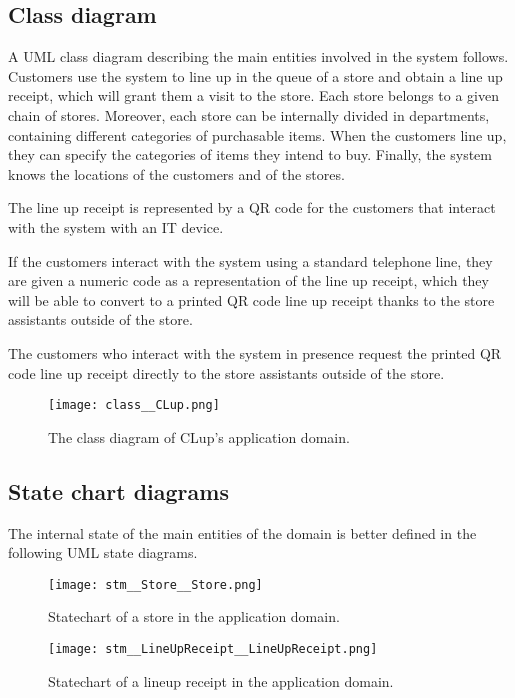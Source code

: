 \documentclass[../../main.tex]{subfiles}
\begin{document}
\subsection{Class diagram}

A UML class diagram describing the main entities involved in the system follows.
Customers use the system to line up in the queue of a store and obtain a line up
receipt, which will grant them a visit to the store. Each store belongs to a given
chain of stores. Moreover, each store can be internally divided in departments,
containing different categories of purchasable items. When the customers line
up, they can specify the categories of items they intend to buy. Finally, the
system knows the locations of the customers and of the stores.

The line up receipt is represented by a QR code for the customers that interact with the system with an IT device.

If the customers interact with the system using a standard telephone line, they are given a numeric code as a representation of the line up receipt, which they will be able to convert to a printed QR code line up receipt thanks to the store assistants outside of the store.

The customers who interact with the system in presence request the printed QR code line up receipt directly to the store assistants outside of the store.

\begin{figure}[H]
    \centering
    \texttt{[image: class\_\_CLup.png]}
    \caption{The class diagram of CLup's application domain.}
\end{figure}

\subsection{State chart diagrams}

The internal state of the main entities of the domain is better defined in the following UML
state diagrams.

\begin{figure}[H]
    \centering
    \texttt{[image: stm\_\_Store\_\_Store.png]}
    \caption{Statechart of a store in the application domain.}
\end{figure}

\begin{figure}[H]
    \centering
    \texttt{[image: stm\_\_LineUpReceipt\_\_LineUpReceipt.png]}
    \caption{Statechart of a lineup receipt in the application domain.}
\end{figure}
\end{document}
